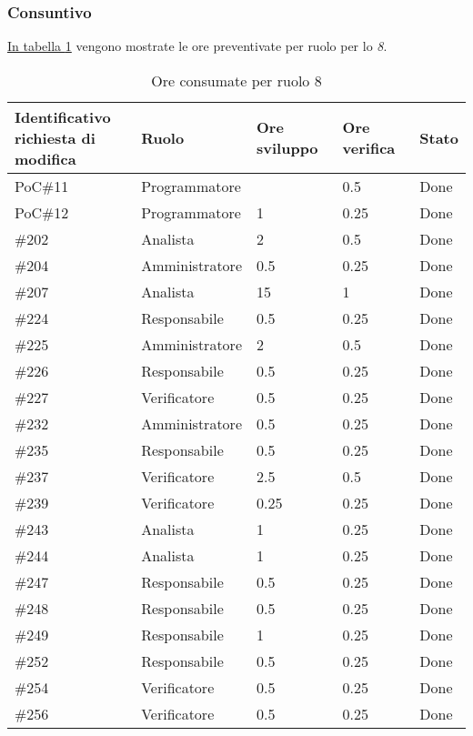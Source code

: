 \subsubsection{Consuntivo}
\hyperref[tab:sprint8_ore_consumate]{In tabella \ref{tab:sprint8_ore_consumate}} vengono mostrate le ore preventivate per ruolo per lo \textit{ 8}.

\begin{table}[H]
    \centering
    \begin{tabular}{| l | l | l | l | l |}
        \hline
            \makecell{\textbf{Identificativo} \\ \textbf{richiesta di modifica}} &
            \textbf{Ruolo} &
            \textbf{Ore sviluppo} &
            \textbf{Ore verifica} &
            \textbf{Stato}\\
        \hline
        PoC\#11 & Programmatore &  & 0.5 & Done\\
        \hline
        PoC\#12 & Programmatore & 1 & 0.25 & Done\\
        \hline
        \#202 & Analista & 2 & 0.5 & Done\\
        \hline
        \#204 & Amministratore & 0.5 & 0.25 & Done\\
        \hline
        \#207 & Analista & 15 & 1 & Done\\
        \hline
        \#224 & Responsabile & 0.5 & 0.25 &  Done\\
        \hline
        \#225 & Amministratore & 2 & 0.5 & Done\\
        \hline
        \#226 & Responsabile & 0.5 & 0.25 & Done\\
        \hline
        \#227 & Verificatore & 0.5 & 0.25 & Done\\
        \hline
        \#232 & Amministratore & 0.5 & 0.25 & Done\\
        \hline
        \#235 & Responsabile & 0.5 & 0.25 & Done\\
        \hline
        \#237 & Verificatore & 2.5 & 0.5 & Done\\
        \hline
        \#239 & Verificatore & 0.25 & 0.25 & Done\\
        \hline
        \#243 & Analista & 1 & 0.25 & Done\\
        \hline
        \#244 & Analista & 1 & 0.25 & Done\\
        \hline
        \#247 & Responsabile & 0.5 & 0.25 & Done\\
        \hline
        \#248 & Responsabile & 0.5 & 0.25 & Done\\
        \hline
        \#249 & Responsabile & 1 & 0.25 & Done\\
        \hline
        \#252 & Responsabile & 0.5 & 0.25 & Done\\
        \hline
        \#254 & Verificatore & 0.5 & 0.25 & Done\\
        \hline
        \#256 & Verificatore & 0.5 & 0.25 & Done\\
        \hline
    \end{tabular}
    \caption{Ore consumate per ruolo  8}
    \label{tab:sprint8_ore_consumate} 
\end{table}
